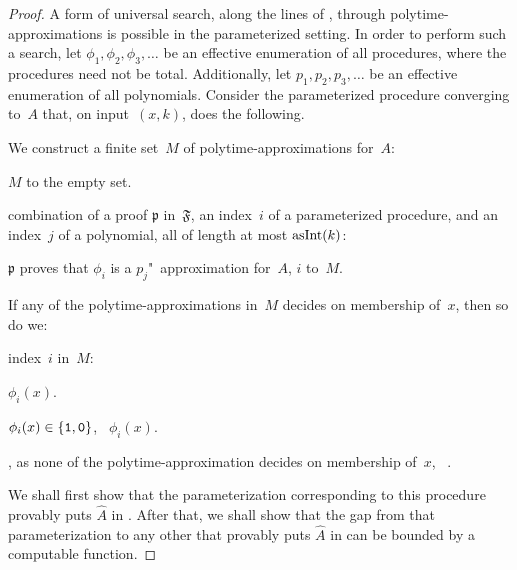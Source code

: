\begin{proof}
  A form of universal search, along the lines of \textcite{hutter2002fastest,hartmanis1979relations}, through polytime-approximations is possible in the parameterized setting.
  In order to perform such a search, let $\phi_1, \phi_2, \phi_3, \ldots$ be an effective enumeration of all procedures, where the procedures need not be total.
  Additionally, let $p_1, p_2, p_3, \ldots$ be an effective enumeration of all polynomials.
  Consider the parameterized procedure converging to~$A$ that, on input~$(x, k)$, does the following.
  \begin{codelisting}
  \item
    We construct a finite set~$M$ of polytime-approximations for~$A$:
    \begin{codelisting}
    \item
       $M$ to the empty set.
    \item
       combination of a proof $\mathfrak{p}$ in~$\mathfrak{F}$, an index~$i$ of a parameterized procedure, and an index~$j$ of a polynomial, all of length at most $\asNat(k)$:
      \begin{codelisting}
      \item\label{code:xpprincipal:approximations}%
         $\mathfrak{p}$ proves that $\phi_i$ is a $p_j$"~approximation for~$A$,
        \itemcont {} $i$ to~$M$.
      \end{codelisting}
    \end{codelisting}
  \item
    If any of the polytime-approximations in~$M$ decides on membership of~$x$, then so do we:
    \begin{codelisting}
    \item
       index~$i$ in~$M$:
      \begin{codelisting}
      \item
         $\phi_i(x)$.
      \item
         $\phi_i(x) \in \{\bits{1}, \bits{0}\}$, ~$\phi_i(x)$.
      \end{codelisting}
    \item
      , as none of the polytime-approximation decides on membership of~$x$, ~.
    \end{codelisting}
  \end{codelisting}

  We shall first show that the parameterization corresponding to this procedure provably puts $\hat{A}$ in .
  After that, we shall show that the gap from that parameterization to any other that provably puts $\hat{A}$ in  can be bounded by a computable function.


\end{proof}

